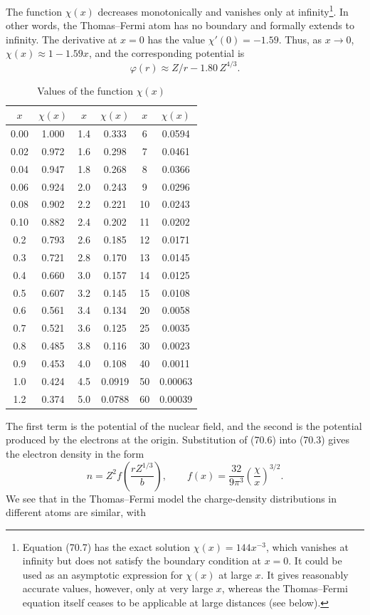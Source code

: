 The function $\chi(x)$ decreases monotonically and vanishes only at infinity\footnote{Equation (70.7) has the exact solution $\chi(x)=144x^{-3}$, which vanishes at infinity but does not satisfy the boundary condition at $x=0$. It could be used as an asymptotic expression for $\chi(x)$ at large $x$. It gives reasonably accurate values, however, only at very large $x$, whereas the Thomas--Fermi equation itself ceases to be applicable at large distances (see below).}. In other words, the Thomas--Fermi atom has no boundary and formally extends to infinity. The derivative at $x=0$ has the value $\chi'(0)=-1.59$. Thus, as $x\to0$, $\chi(x)\approx1-1.59x$, and the corresponding potential is
\begin{equation}\varphi(r)\approx Z/r-1.80\,Z^{4/3}.\tag{70.8}\end{equation}

\begin{table}[ht]
\centering
\caption{Values of the function $\chi(x)$}
\begin{tabular}{cc|cc|cc}
$x$&$\chi(x)$&$x$&$\chi(x)$&$x$&$\chi(x)$\\\hline
0.00&1.000&1.4&0.333&6&0.0594\\0.02&0.972&1.6&0.298&7&0.0461\\0.04&0.947&1.8&0.268&8&0.0366\\0.06&0.924&2.0&0.243&9&0.0296\\0.08&0.902&2.2&0.221&10&0.0243\\0.10&0.882&2.4&0.202&11&0.0202\\0.2&0.793&2.6&0.185&12&0.0171\\0.3&0.721&2.8&0.170&13&0.0145\\0.4&0.660&3.0&0.157&14&0.0125\\0.5&0.607&3.2&0.145&15&0.0108\\0.6&0.561&3.4&0.134&20&0.0058\\0.7&0.521&3.6&0.125&25&0.0035\\0.8&0.485&3.8&0.116&30&0.0023\\0.9&0.453&4.0&0.108&40&0.0011\\1.0&0.424&4.5&0.0919&50&0.00063\\1.2&0.374&5.0&0.0788&60&0.00039
\end{tabular}
\end{table}
The first term is the potential of the nuclear field, and the second is the potential produced by the electrons at the origin. Substitution of (70.6) into (70.3) gives the electron density in the form
\begin{equation}n=Z^2f\left(\frac{rZ^{1/3}}b\right),\qquad f(x)=\frac{32}{9\pi^3}\left(\frac\chi x\right)^{3/2}.\tag{70.9}\end{equation}
We see that in the Thomas--Fermi model the charge-density distributions in different atoms are similar, with

